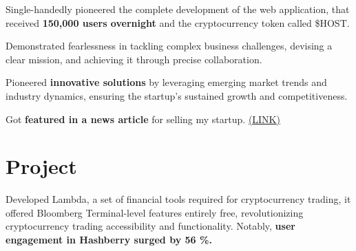 \documentclass[a4paper]{deedy-resume} %
\begin{document}
\begin{minipage}[t]{0.66\textwidth}
\sectionspace 


\vspace{\topsep} 

\begin{tightitemize}
\item Single-handedly pioneered the complete development of the web application, that received \textbf{150,000 users overnight }and the cryptocurrency token called \$HOST.
\item Demonstrated fearlessness in tackling complex business challenges, devising a clear mission, and achieving it through precise collaboration.
\item Pioneered \textbf{innovative solutions }by leveraging emerging market trends and industry dynamics, ensuring the startup's sustained growth and competitiveness.
\item Got \textbf{featured in a news article} for selling my startup. %
\href{https://www.deccanherald.com/brandspot/sponsored/meet-the-crypto-boy-of-bengaluru-1221031.html}{(LINK)}
\end{tightitemize}

\sectionspace 





\section{Project}






Developed Lambda, a set of financial tools required for cryptocurrency trading, it offered Bloomberg Terminal-level features entirely free, revolutionizing cryptocurrency trading accessibility and functionality. Notably, \textbf{user engagement in Hashberry surged by 56 \%. }\\

\sectionspace %


\end{minipage}
\end{document}
